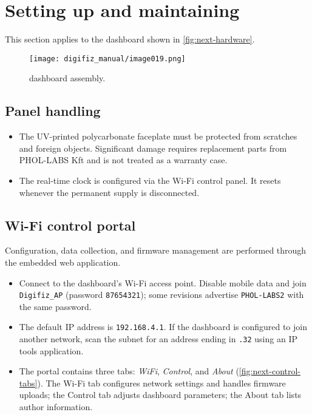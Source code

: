 \chapter{Setting up and maintaining \ReplicaNextLong{}}\label{ch:replica-next-setup}

This section applies to the \ReplicaNextLong{} dashboard shown in \autoref{fig:next-hardware}.

\begin{figure}[htbp]
    \centering
    \texttt{[image: digifiz\_manual/image019.png]}
    \caption{\ReplicaNextLong{} dashboard assembly.}
    \label{fig:next-hardware}
\end{figure}

\section{Panel handling}
\begin{itemize}
    \item The UV-printed polycarbonate faceplate must be protected from scratches and foreign objects. Significant damage requires replacement parts from PHOL-LABS Kft and is not treated as a warranty case.
    \item The real-time clock is configured via the Wi-Fi control panel. It resets whenever the permanent supply is disconnected.
\end{itemize}

\section{Wi-Fi control portal}
Configuration, data collection, and firmware management are performed through the embedded web application.
\begin{itemize}
    \item Connect to the dashboard's Wi-Fi access point. Disable mobile data and join \texttt{Digifiz\_AP} (password \texttt{87654321}); some revisions advertise \texttt{PHOL-LABS2} with the same password.
    \item The default IP address is \texttt{192.168.4.1}. If the dashboard is configured to join another network, scan the subnet for an address ending in \texttt{.32} using an IP tools application.
    \item The portal contains three tabs: \emph{WiFi}, \emph{Control}, and \emph{About} (\autoref{fig:next-control-tabs}). The Wi-Fi tab configures network settings and handles firmware uploads; the Control tab adjusts dashboard parameters; the About tab lists author information.
\end{itemize}

